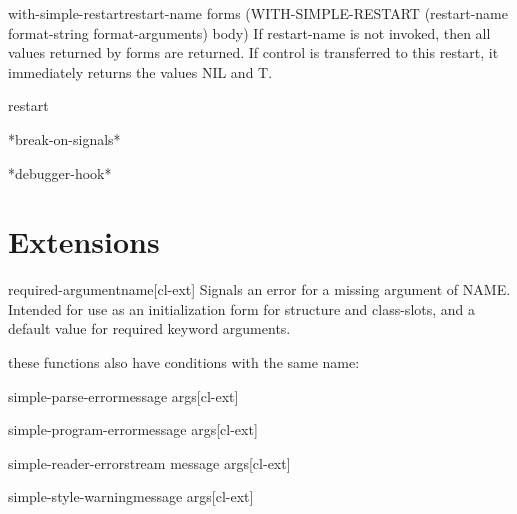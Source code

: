 \documentclass[10pt,english]{book}
\begin{document}
\begin{macro}{with-simple-restart}{restart-name \body forms}
  (WITH-SIMPLE-RESTART (restart-name format-string format-arguments)
   body)
   If restart-name is not invoked, then all values returned by forms are
   returned. If control is transferred to this restart, it immediately
   returns the values NIL and T.
\end{macro}

\begin{class}{restart}{}
  
\end{class}

\begin{variable}{*break-on-signals*}{}
  
\end{variable}

\begin{variable}{*debugger-hook*}{}
  
\end{variable}

\section{Extensions}
\label{sec:extensions}

\begin{function}{required-argument}{\op name}[cl-ext]
  Signals an error for a missing argument of NAME. Intended for
use as an initialization form for structure and class-slots, and
a default value for required keyword arguments.
\end{function}

these functions also have conditions with the same name:

\begin{function}{simple-parse-error}{message \rest args}[cl-ext]
  
\end{function}

\begin{function}{simple-program-error}{message \rest args}[cl-ext]
  
\end{function}

\begin{function}{simple-reader-error}{stream message \rest args}[cl-ext]
  
\end{function}

\begin{function}{simple-style-warning}{message \rest args}[cl-ext]
  
\end{function}
\end{document}
